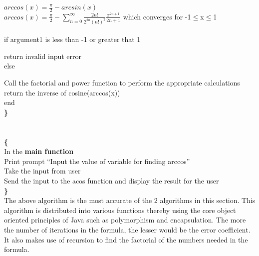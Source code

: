 \documentclass[12pt]{report}
\begin{document}
			$arccos(x)=\frac{\pi}{2}-arcsin(x)$\\
			$arccos(x)=\frac{\pi}{2}-\sum_{n=0}^{\infty}\frac{2n!}{2^{2n}(n!)^2}\frac{x^{2n+1}}{2n+1}$ which converges for -1$\leq$x$\leq$1\\\\
			if argument1 is less than -1 or greater that 1\par
			\vspace{-0.3cm}return invalid input error\\
			else\par
			\vspace{-0.3cm}Call the factorial and power function to perform the appropriate calculations\\
			return the inverse of cosine(arccos(x))\\
			end\\
			\textbf{\}}\\\\\\
			\textbf{\{}\\
				In the \textbf{main function}\\
				Print prompt “Input the value of variable for finding arccos”\\
				Take the input from user\\
				Send the input to the acos function and display the result for the user\\
			\textbf{\}}\\
			
		The above algorithm is the most accurate of the 2 algorithms in this section. This algorithm is distributed into various functions thereby using the core object oriented principles of Java such as polymorphism and encapsulation. The more the number of iterations in the formula, the lesser would be the error coefficient. It also makes use of recursion to find the factorial of the numbers needed in the formula.
\end{document}
